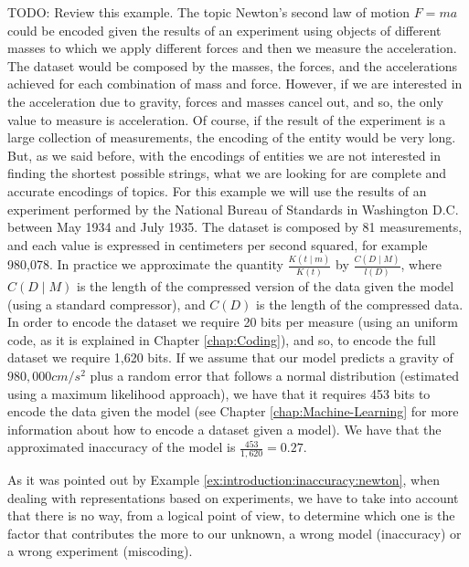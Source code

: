 \begin{example}
\label{ex:introduction:inaccuracy:newton}
{\color{red} TODO: Review this example.}
The topic Newton's second law of motion $F = m a$ could be encoded given the results of an experiment using objects of different masses to which we apply different forces and then we measure the acceleration. The dataset would be composed by the masses, the forces, and the accelerations achieved for each combination of mass and force. However, if we are interested in the acceleration due to gravity, forces and masses cancel out, and so, the only value to measure is acceleration.  Of course, if the result of the experiment is a large collection of measurements, the encoding of the entity would be very long. But, as we said before, with the encodings of entities we are not interested in finding the shortest possible strings, what we are looking for are complete and accurate encodings of topics. For this example we will use the results of an experiment performed by the National Bureau of Standards in Washington D.C. between May 1934 and July 1935. The dataset is composed by 81 measurements, and each value is expressed in centimeters per second squared, for example 980,078. In practice we approximate the quantity $\frac{ K(t \mid m) } {K(t)}$ by $\frac{ C(D \mid M) } {l(D)}$, where $C(D \mid M)$ is the length of the compressed version of the data given the model (using a standard compressor), and $C(D)$ is the length of the compressed data. In order to encode the dataset we require 20 bits per measure (using an uniform code, as it is explained in Chapter \ref{chap:Coding}), and so, to encode the full dataset we require 1,620 bits. If we assume that our model predicts a gravity of $980,000 cm/s^2$ plus a random error that follows a normal distribution (estimated using a maximum likelihood approach), we have that it requires 453 bits to encode the data given the model (see Chapter \ref{chap:Machine-Learning} for more information about how to encode a dataset given a model). We have that the approximated inaccuracy of the model is $\frac{453}{1,620} = 0.27$.
\end{example}

As it was pointed out by Example \ref{ex:introduction:inaccuracy:newton}, when dealing with representations based on experiments, we have to take into account that there is no way, from a logical point of view, to determine which one is the factor that contributes the more to our unknown, a wrong model (inaccuracy) or a wrong experiment (miscoding).


